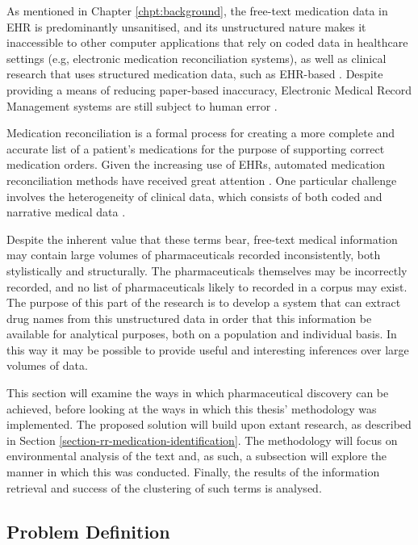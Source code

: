 As mentioned in Chapter \ref{chpt:background}, the free-text medication data in EHR is predominantly unsanitised, and its unstructured nature makes it inaccessible to other computer applications that rely on coded data in healthcare settings (e.g, electronic medication reconciliation systems), as well as clinical research that uses structured medication data, such as EHR-based \cite{kushima2012text}. Despite providing a means of reducing paper-based inaccuracy, Electronic Medical Record Management systems are still subject to human error \cite{koppel2009emr}.

Medication reconciliation is a formal process for creating a more complete and accurate list of a patient's medications for the purpose of supporting correct medication orders. Given the increasing use of EHRs, automated medication reconciliation methods have received great attention \cite{grossman2014hospital}. One particular challenge involves the heterogeneity of clinical data, which consists of both coded and narrative medical data \cite{michaelsen2015medication}.

Despite the inherent value that these terms bear, free-text medical information may contain large volumes of pharmaceuticals recorded inconsistently, both stylistically and structurally. The pharmaceuticals themselves may be incorrectly recorded, and no list of pharmaceuticals likely to recorded in a corpus may exist. The purpose of this part of the research is to develop a system that can extract drug names from this unstructured data in order that this information be available for analytical purposes, both on a population and individual basis. In this way it may be possible to provide useful and interesting inferences over large volumes of data.




This section will examine the ways in which pharmaceutical discovery can be achieved, before looking at the ways in which this thesis' methodology was implemented. The proposed solution will build upon extant research, as described in Section \ref{section-rr-medication-identification}. The methodology will focus on environmental analysis of the text and, as such, a subsection will explore the manner in which this was conducted. Finally, the results of the information retrieval and success of the clustering of such terms is analysed.   




\subsection{Problem Definition}

